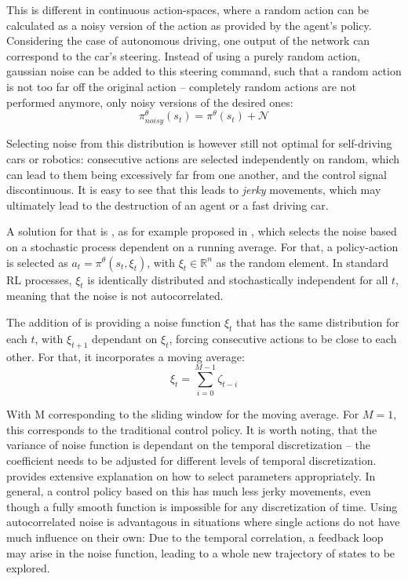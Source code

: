 This is different in continuous action-spaces, where a random action can be calculated as a noisy version of the action as provided by the agent's policy. Considering the case of autonomous driving, one output of the network can correspond to the car's steering. Instead of using a purely random action, gaussian noise can be added to this steering command, such that a random action is not too far off the original action -- completely random actions are not performed anymore, only noisy versions of the desired ones:
\begin{equation*}
	\pi^\theta_{noisy}(s_t) = \pi^\theta(s_t) + \mathcal{N}
\end{equation*}

Selecting noise from this distribution is however still not optimal for self-driving cars or robotics: consecutive actions are selected independently on random, which can lead to them being excessively far from one another, and the control signal discontinuous. It is easy to see that this leads to \textit{jerky} movements, which may ultimately lead to the destruction of an agent or a fast driving car. 

A solution for that is , as for example proposed in \cite{wawrzynski_control_2015}, which selects the noise based on a stochastic process dependent on a running average. For that, a policy-action is selected as $a_t = \pi^\theta(s_t, \xi_t)$, with $\xi_t \in \mathds{R}^n$ as the random element. In standard RL processes, $\xi_t$ is identically distributed and stochastically independent for all $t$, meaning that the noise is not autocorrelated.

The addition of \cite{wawrzynski_control_2015} is providing a noise function $\xi_t$ that has the same distribution for each $t$, with $\xi_{t+1}$ dependant on $\xi_t$, forcing consecutive actions to be close to each other. For that, it incorporates a moving average:\\
\begin{equation*}
	\xi_t = \sum^{M-1}_{i=0} \zeta_{t-i}
\end{equation*}

With M corresponding to the sliding window for the moving average. For $M=1$, this corresponds to the traditional control policy. It is worth noting, that the variance of noise function is dependant on the temporal discretization -- the coefficient needs to be adjusted for different levels of temporal discretization. \cite{wawrzynski_control_2015} provides extensive explanation on how to select parameters appropriately. In general, a control policy based on this has much less jerky movements, even though a fully smooth function is impossible for any discretization of time. Using autocorrelated noise is advantagous in situations where single actions do not have much influence on their own: Due to the temporal correlation, a feedback loop may arise in the noise function, leading to a whole new trajectory of states to be explored.


